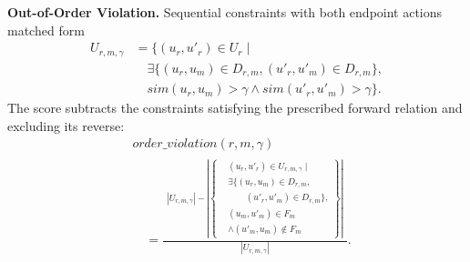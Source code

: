 \textbf{Out-of-Order Violation.} Sequential constraints with both endpoint actions matched form
\begin{equation}
\begin{aligned}
U_{r,m,\gamma}
&=\bigl\{(u_r,u'_r)\in U_r\mid\\
&\quad\exists\bigl\{(u_r,u_m)\in D_{r,m},
(u'_r,u'_m)\in D_{r,m}\bigr\},\\
&\quad sim(u_r,u_m)>\gamma\land
sim(u'_r,u'_m)>\gamma\bigr\}.
\end{aligned}
\label{eq:order_evaluable}
\end{equation}
The score subtracts the constraints satisfying the prescribed forward relation and excluding its reverse:
\begin{equation}
\begin{aligned}
&\mathit{order\_violation}(r,m,\gamma)\\
&\quad=\frac{
\begin{gathered}
|U_{r,m,\gamma}|-\left|\left\{\begin{aligned}
&(u_r,u'_r)\in U_{r,m,\gamma}\mid\\
&\exists\bigl\{(u_r,u_m)\in D_{r,m},\\
&\qquad (u'_r,u'_m)\in D_{r,m}\bigr\},\\
&(u_m,u'_m)\in F_m\\
&\land(u'_m,u_m)\notin F_m
\end{aligned}\right\}\right|
\end{gathered}
}{|U_{r,m,\gamma}|}.
\end{aligned}
\label{eq:order}
\end{equation}
